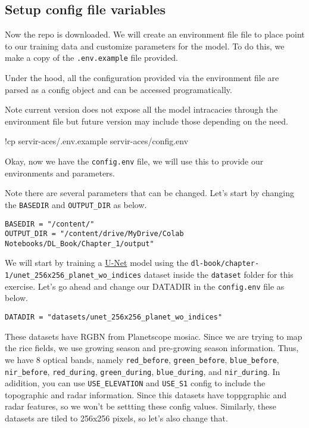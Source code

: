 \documentclass[
  letterpaper,
  DIV=11,
  numbers=noendperiod]{scrreprt}
\newenvironment{Shaded}{\begin{snugshade}}{\end{snugshade}}
\newcommand{\NormalTok}[1]{\textcolor[rgb]{0.00,0.23,0.31}{#1}}
\newcommand{\OperatorTok}[1]{\textcolor[rgb]{0.37,0.37,0.37}{#1}}
\begin{document}
\subsection{Setup config file
variables}\label{setup-config-file-variables}

Now the repo is downloaded. We will create an environment file file to
place point to our training data and customize parameters for the model.
To do this, we make a copy of the \texttt{.env.example} file provided.

Under the hood, all the configuration provided via the environment file
are parsed as a config object and can be accessed programatically.

Note current version does not expose all the model intracacies through
the environment file but future version may include those depending on
the need.

\begin{Shaded}
\begin{Highlighting}[]
\OperatorTok{!}\NormalTok{cp servir}\OperatorTok{{-}}\NormalTok{aces}\OperatorTok{/}\NormalTok{.env.example servir}\OperatorTok{{-}}\NormalTok{aces}\OperatorTok{/}\NormalTok{config.env}
\end{Highlighting}
\end{Shaded}

Okay, now we have the \texttt{config.env} file, we will use this to
provide our environments and parameters.

Note there are several parameters that can be changed. Let's start by
changing the \texttt{BASEDIR} and \texttt{OUTPUT\_DIR} as below.

\begin{verbatim}
BASEDIR = "/content/"
OUTPUT_DIR = "/content/drive/MyDrive/Colab Notebooks/DL_Book/Chapter_1/output"
\end{verbatim}

We will start by training a \href{https://insert-citation-here}{U-Net}
model using the
\texttt{dl-book/chapter-1/unet\_256x256\_planet\_wo\_indices} dataset
inside the \texttt{dataset} folder for this exercise. Let's go ahead and
change our DATADIR in the \texttt{config.env} file as below.

\begin{verbatim}
DATADIR = "datasets/unet_256x256_planet_wo_indices"
\end{verbatim}

These datasets have RGBN from Planetscope mosiac. Since we are trying to
map the rice fields, we use growing season and pre-growing season
information. Thus, we have 8 optical bands, namely \texttt{red\_before},
\texttt{green\_before}, \texttt{blue\_before}, \texttt{nir\_before},
\texttt{red\_during}, \texttt{green\_during}, \texttt{blue\_during}, and
\texttt{nir\_during}. In adidition, you can use \texttt{USE\_ELEVATION}
and \texttt{USE\_S1} config to include the topographic and radar
information. Since this datasets have toppgraphic and radar features, so
we won't be settting these config values. Similarly, these datasets are
tiled to 256x256 pixels, so let's also change that.
\end{document}
